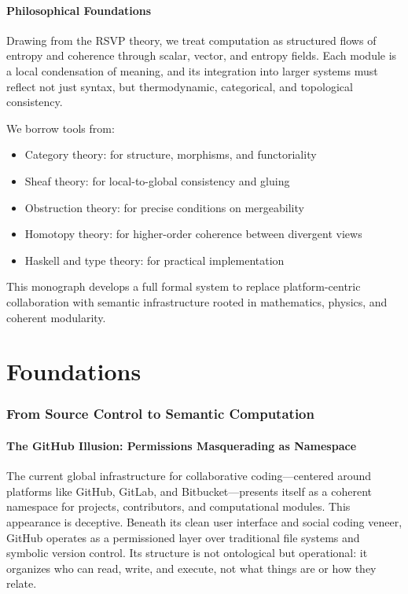\documentclass[12pt]{article}
\begin{document}
\subsection*{Philosophical Foundations}
Drawing from the RSVP theory, we treat computation as structured flows of entropy and coherence through scalar, vector, and entropy fields. Each module is a local condensation of meaning, and its integration into larger systems must reflect not just syntax, but thermodynamic, categorical, and topological consistency.

We borrow tools from:
\begin{itemize}
    \item Category theory: for structure, morphisms, and functoriality
    \item Sheaf theory: for local-to-global consistency and gluing
    \item Obstruction theory: for precise conditions on mergeability
    \item Homotopy theory: for higher-order coherence between divergent views
    \item Haskell and type theory: for practical implementation
\end{itemize}
This monograph develops a full formal system to replace platform-centric collaboration with semantic infrastructure rooted in mathematics, physics, and coherent modularity.

\tableofcontents

\part{Foundations}

\section{From Source Control to Semantic Computation}
\subsection{The GitHub Illusion: Permissions Masquerading as Namespace}
The current global infrastructure for collaborative coding—centered around platforms like GitHub, GitLab, and Bitbucket—presents itself as a coherent namespace for projects, contributors, and computational modules. This appearance is deceptive. Beneath its clean user interface and social coding veneer, GitHub operates as a permissioned layer over traditional file systems and symbolic version control. Its structure is not ontological but operational: it organizes who can read, write, and execute, not what things are or how they relate.
\end{document}
